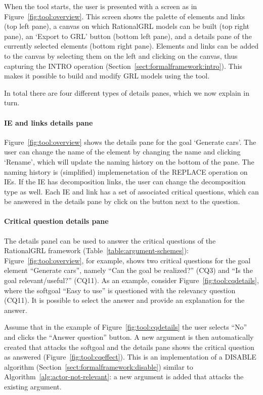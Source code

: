 When the tool starts, the user is presented with a screen as in Figure~\ref{fig:tool:overview}. This screen shows the palette of elements and links (top left pane), a canvas on which RationalGRL models can be built (top right pane), an `Export to GRL' button (bottom left pane), and a details pane of the currently selected elements (bottom right pane). Elements and links can be added to the canvas by selecting them on the left and clicking on the canvas, thus capturing the \textsf{INTRO} operation (Section~\ref{sect:formalframework:intro}). This makes it possible to build and modify GRL models using the tool. 

In total there are four different types of details panes, which we now explain in turn.

\paragraph{IE and links details pane} Figure~\ref{fig:tool:overview} shows the details pane for the goal `Generate cars'. The user can change the name of the element by changing the name and clicking `Rename', which will update the naming history on the bottom of the pane. The naming history is (simplified) implemenetation of the \textsf{REPLACE} operation on IEs. If the IE has decomposition links, the user can change the decomposition type as well. Each IE and link has a set of associated critical questions, which can be answered in the details pane by click on the button next to the question.

\paragraph{Critical question details pane} The details panel can be used to answer the critical questions of the RationalGRL framework (Table~\ref{table:argument-schemes}): Figure~\ref{fig:tool:overview}, for example, shows two critical questions for the goal element ``Generate cars'', namely ``Can the goal be realized?'' (CQ3) and ``Is the goal relevant/useful?'' (CQ11). As an example, consider Figure~\ref{fig:tool:cqdetails}, where the softgoal ``Easy to use'' is questioned with the relevancy question (CQ11). It is possible to select the answer and provide an explanation for the answer. 

Assume that in the example of Figure~\ref{fig:tool:cqdetails} the user selects ``No'' and clicks the ``Answer question'' button. A new argument is then automatically created that attacks the softgoal and the details pane shows the critical question as answered (Figure~\ref{fig:tool:cqeffect}). This is an implementation of a \textsf{DISABLE} algorithm (Section~\ref{sect:formalframework:disable}) similar to Algorithm~\ref{alg:actor-not-relevant}: a new argument is added that attacks the existing argument. 

